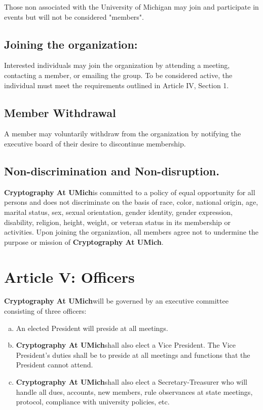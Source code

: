 \documentclass[11pt]{article}
\newcommand{\orgname}{\textbf{Cryptography At UMich}}
\begin{document}
    Those non associated with the University of Michigan may join and participate in events but will not be considered "members".

    \subsection{Joining the organization:}

    Interested individuals may join the organization by attending a meeting, contacting a member, or emailing the group.
    To be considered active, the individual must meet the requirements outlined in Article IV, Section 1.

    \subsection{Member Withdrawal}

    A member may voluntarily withdraw from the organization by notifying the executive board of their desire to discontinue membership.

    \subsection{Non-discrimination and Non-disruption. }

    \orgname is committed to a policy of equal opportunity for all persons and does not discriminate on the basis of race, color, national origin, age, marital status, sex, sexual orientation, gender identity, gender expression, disability, religion, height, weight, or veteran status in its membership or activities.
    Upon joining the organization, all members agree not to undermine the purpose or mission of \orgname.


    \section{Article V: Officers}

    \orgname will be governed by an executive committee consisting of three officers:

    \begin{enumerate}
        [a)]
        \item An elected President will preside at all meetings.
        \item \orgname shall also elect a Vice President.
        The Vice President's duties shall be to preside at all meetings and functions that the President cannot attend.
        \item \orgname shall also elect a Secretary-Treasurer who will handle all dues, accounts, new members, rule observances at state meetings, protocol, compliance with university policies, etc.
    \end{enumerate}
\end{document}
